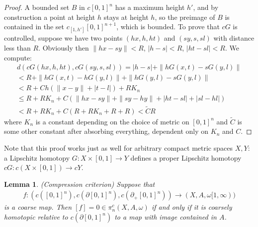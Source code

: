 \documentclass[a4paper,11pt]{article}
\theoremstyle{definition}
\theoremstyle{plain}
\newtheorem{lemma}[definition]{Lemma}
\theoremstyle{remark}
\begin{document}
\begin{proof} A bounded set $B$ in $c[0,1]^n$ has a maximum height $h'$, and by construction a point at height $h$ stays at height $h$, so the preimage of $B$ is contained in the set $c_{[1,h']} [0,1]^{n+1}$, which is bounded. To prove that $cG$ is controlled, suppose we have two points $(hx,h,ht)$ and $(sy,s,sl)$ with distance less than $R$. Obviously then $\|hx-sy\|<R$, $|h-s|<R$, $|ht-sl|<R$. We compute:
\begin{align*}
d(cG(hx,h,ht), cG(sy,s,sl))= |h-s| + \|hG(x,t)-s G(y,l)\| \\
<R + \|h G(x,t)-h G(y,l)\|+ \|hG(y,l)-sG(y,l)\| \\
<R +Ch(\|x-y\|+ |t-l|) + RK_n \\
\leq R+ RK_{n}+ C(\|hx-sy\|+ \|sy-hy\|+ |ht-sl|+ |sl-hl|) \\
< R+ RK_n + C(R+RK_n+R+R)
< \tilde{C} R
\end{align*}
where $K_n$ is a constant depending on the choice of metric on $[0,1]^n$ and $\tilde{C}$ is some other constant after absorbing everything, dependent only on $K_n$ and $C$. 
\end{proof}


Note that this proof works just as well for arbitrary compact metric spaces $X,Y$: a Lipschitz homotopy $G: X\times [0,1]\rightarrow Y$ defines a proper Lipschitz homotopy $cG: c(X \times [0,1])\rightarrow cY$.


\begin{lemma} (Compression criterion) \label{compression} Suppose that
\begin{align*}
f: (c([0,1]^n), c(\partial [0,1]^n), c(\partial_{+}[0,1]^n))\rightarrow (X,A,\omega[1,\infty))
\end{align*}
is a coarse map. Then $[f] = 0 \in \pi_n^c(X,A,\omega)$ if and only if it is coarsely homotopic relative to $c(\partial [0,1]^n)$ to a map with image contained in $A$.
\end{lemma}
\end{document}
